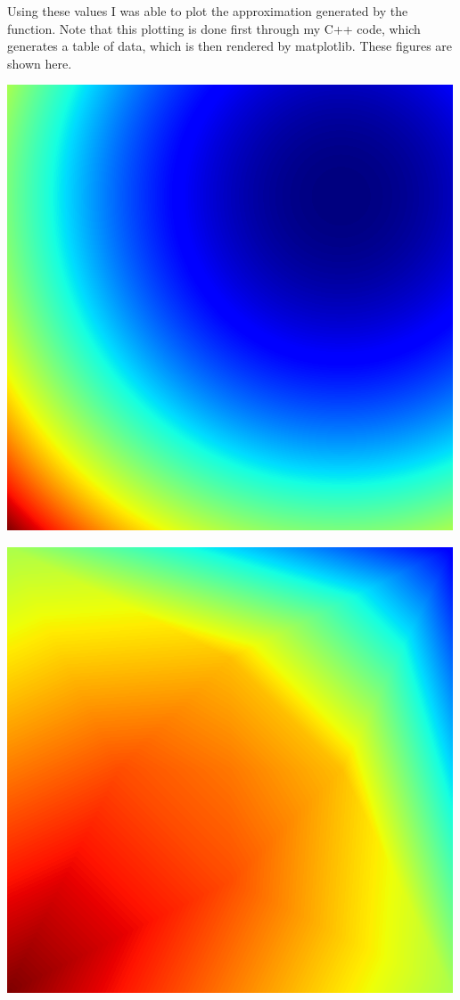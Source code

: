 \documentclass[9pt]{amsart}
\newenvironment{Figure}
{\par\medskip\noindent\minipage{\linewidth}}
{\endminipage\par\medskip}
\begin{document}
Using these values I was able to plot the approximation generated by the
function. Note that this plotting is done first through my C++ code, which
generates a table of data, which is then rendered by matplotlib. These figures
are shown here.

\begin{multicols}{2}
  \begin{Figure}
     \begin{center}
       \includegraphics[width=0.8\linewidth]{forcing.png}
     \end{center}
     \label{fig:forcing}
  \end{Figure}

  \begin{Figure}
     \begin{center}
       \includegraphics[width=0.8\linewidth]{CASE_2.png}
     \end{center}
     \label{fig:CASE_2}
  \end{Figure}
\end{multicols}
\end{document}
